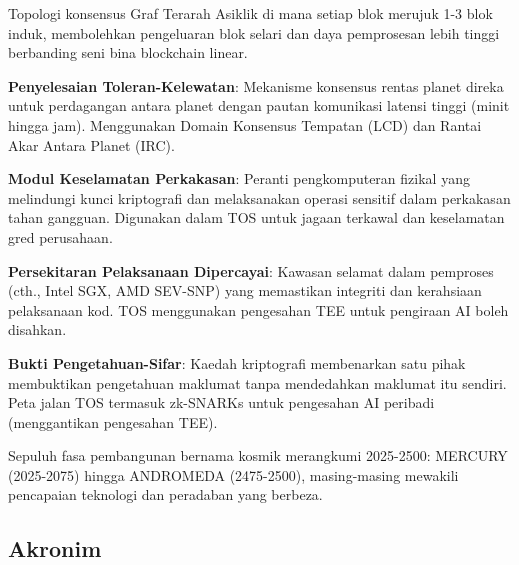 \documentclass[11pt]{article}
\begin{document}
\begin{description}[leftmargin=3cm, style=nextline]
  \item[BlockDAG] Topologi konsensus Graf Terarah Asiklik di mana setiap blok merujuk 1-3 blok induk, membolehkan pengeluaran blok selari dan daya pemprosesan lebih tinggi berbanding seni bina blockchain linear.

  \item[DT-Settlement] \textbf{Penyelesaian Toleran-Kelewatan}: Mekanisme konsensus rentas planet direka untuk perdagangan antara planet dengan pautan komunikasi latensi tinggi (minit hingga jam). Menggunakan Domain Konsensus Tempatan (LCD) dan Rantai Akar Antara Planet (IRC).

  \item[HSM] \textbf{Modul Keselamatan Perkakasan}: Peranti pengkomputeran fizikal yang melindungi kunci kriptografi dan melaksanakan operasi sensitif dalam perkakasan tahan gangguan. Digunakan dalam TOS untuk jagaan terkawal dan keselamatan gred perusahaan.

  \item[TEE] \textbf{Persekitaran Pelaksanaan Dipercayai}: Kawasan selamat dalam pemproses (cth., Intel SGX, AMD SEV-SNP) yang memastikan integriti dan kerahsiaan pelaksanaan kod. TOS menggunakan pengesahan TEE untuk pengiraan AI boleh disahkan.

  \item[Bukti ZK] \textbf{Bukti Pengetahuan-Sifar}: Kaedah kriptografi membenarkan satu pihak membuktikan pengetahuan maklumat tanpa mendedahkan maklumat itu sendiri. Peta jalan TOS termasuk zk-SNARKs untuk pengesahan AI peribadi (menggantikan pengesahan TEE).

  \item[Era Angkasa] Sepuluh fasa pembangunan bernama kosmik merangkumi 2025-2500: MERCURY (2025-2075) hingga ANDROMEDA (2475-2500), masing-masing mewakili pencapaian teknologi dan peradaban yang berbeza.
\end{description}

\subsection*{Akronim}
\end{document}
